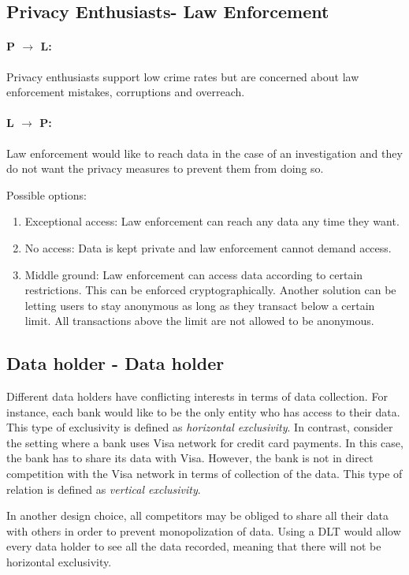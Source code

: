\documentclass[runningheads]{llncs}
\begin{document}
\subsection{Privacy Enthusiasts- Law Enforcement}
\paragraph{P $\rightarrow$ L:} Privacy enthusiasts support low crime rates but are concerned about law enforcement mistakes, corruptions and overreach.
\paragraph{L $\rightarrow$ P:} Law enforcement would like to reach data in the case of an investigation and they do not want the privacy measures to prevent them from doing so.


Possible options:
\begin{enumerate}
	\item Exceptional access: Law enforcement can reach any data any time they want.
	\item No access: Data is kept private and law enforcement cannot demand access.
	\item Middle ground: Law enforcement can access data according to certain restrictions. This can be enforced cryptographically. Another solution can be letting users to stay anonymous as long as they transact below a certain limit. All transactions above the limit are not allowed to be anonymous.
\end{enumerate}

\subsection{Data holder - Data holder}
Different data holders have conflicting interests in terms of data collection. For instance, each bank would like to be the only entity who has access to their data. This type of exclusivity is defined as \textit{horizontal exclusivity}. In contrast, consider the setting where a bank uses Visa network for credit card payments. In this case, the bank has to share its data with Visa. However, the bank is not in direct competition with the Visa network in terms of collection of the data. This type of relation is defined as \textit{vertical exclusivity}. 

In another design choice, all competitors may be obliged to share all their data with others in order to prevent monopolization of data. Using a DLT would allow every data holder to see all the data recorded, meaning that there will not be horizontal exclusivity.
\end{document}
